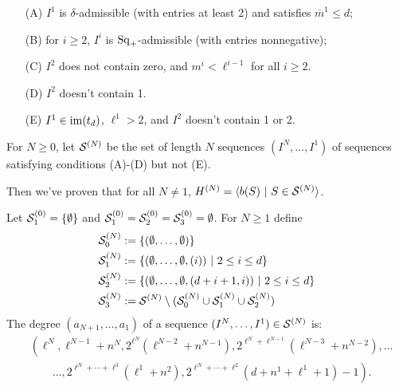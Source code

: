 \documentclass[10pt]{article}
\newcommand{\SqShift}{\Sq_{\smash{+}}}
\newcommand{\Sq}{\mathrm{Sq}}
\newcommand{\minDim}{m}
\newcommand{\minDimP}{\overline{m}}
\begin{document}
\begin{AxisComputationSummary}

\begin{shaded}
\begin{enumerate}[A)]
\squishlist
\setlength{\parindent}{.25in}
\item[\textup{(A)}] $I^1$ is $\delta$-admissible (with entries at least 2) and satisfies $\minDimP^1\leq d$;
\item[\textup{(B)}] for $i\geq2$, $I^i$ is $\SqShift$-admissible (with entries nonnegative);
\item[\textup{(C)}] $I^2$ does not contain zero, and $\minDim^i<\ell^{i-1}$ for all $i\geq2$.
\item[(D)] $I^2$ doesn't contain 1.
\item[(E)] $I^1\in\operatorname{im}(t_d)$, $\ell^1>2$, and $I^2$ doesn't contain 1 or 2.
\end{enumerate}
For $N\geq0$, let $\mathcal{S}^{(N)}$ be the set of length $N$ sequences $(I^{N},\ldots,I^1)$ of sequences satisfying conditions \textup{(A)}-\textup{(D)} but not \textup{(E)}.

Then we've proven that for all $N\neq1$, $H^{(N)}=\langle b(S)\ |\ S\in\mathcal{S}^{(N)}\rangle$.

Let $\mathcal{S}^{(0)}_1=\{\emptyset\}$ and $\mathcal{S}^{(0)}_1=\mathcal{S}^{(0)}_2=\mathcal{S}^{(0)}_3=\emptyset$. For $N\geq1$ define
\begin{alignat*}{2}
\calS^{(N)}_0
&:=
\{(\emptyset,\ldots,\emptyset)\}%
\\
\calS^{(N)}_1
&:=%
\{(\emptyset,\ldots,\emptyset,(i))\ |\ 2\leq i\leq d\}\\
\calS^{(N)}_2&:=
\{(\emptyset,\ldots,\emptyset,(d+i+1,i))\ |\ 2\leq i\leq d\}\\
\calS^{(N)}_3&:=\calS^{(N)}\setminus(\calS^{(N)}_0 \cup\calS^{(N)}_1\cup \calS^{(N)}_2)
\end{alignat*}
The degree $ (a_{N+1},\ldots,a_1) $ of a sequence $(I^N,\ldots,I^1)\in\mathcal{S}^{(N)}$ is:
\begin{align*}
& \left( \ell^N,\ell^{N-1}+n^N,2^{\ell^N}\!\left(\ell^{N-2}+n^{N-1}\right), 2^{\ell^N+\ell^{N-1}}\!\left(\ell^{N-3}+n^{N-2}\right),\ldots \right.\\
 &\qquad \left.{}\ldots,2^{\ell^N+\cdots+\ell^{3}}(\ell^1+n^2),2^{\ell^N+\cdots+\ell^{2}}(d+n^1+\ell^1+1)-1 \right).
\end{align*}



\end{shaded}
\end{AxisComputationSummary}
\end{document}
